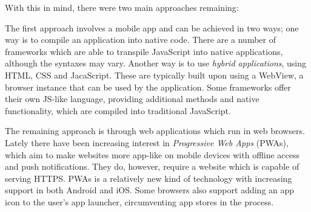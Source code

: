 With this in mind, there were two main approaches remaining:

The first approach involves a mobile app and can be achieved in two ways; one way is to compile an application into native code. There are a number of frameworks which are able to transpile JavaScript into native applications, although the syntaxes may vary. Another way is to use \emph{hybrid applications}, using HTML, CSS and JacaScript. These are typically built upon using a WebView, a browser instance that can be used by the application. Some frameworks offer their own JS-like language, providing additional methods and native functionality, which are compiled into traditional JavaScript.

The remaining approach is through web applications which run in web browsers. Lately there have been increasing interest in \emph{Progressive Web Apps} (PWAs), which aim to make websites more app-like on mobile devices with offline access and push notifications. They do, however, require a website which is capable of serving HTTPS. PWAs is a relatively new kind of technology with increasing support in both Android and iOS. Some browsers also support adding an app icon to the user's app launcher, circumventing app stores in the process.